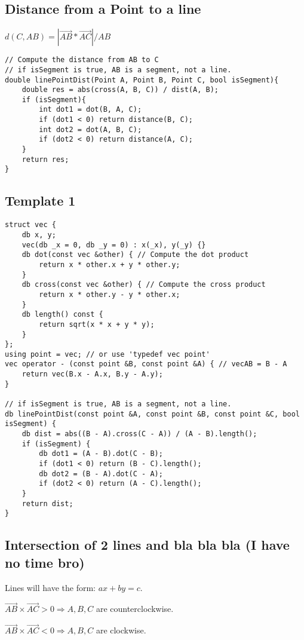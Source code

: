 \documentclass[11pt,a4paper]{article}
\begin{document}
\begin{multicols*}{2}
\subsection{Distance from a Point to a line}
$d(C, AB) = |\vec{AB} * \vec{AC}|/AB $
\begin{lstlisting}
// Compute the distance from AB to C
// if isSegment is true, AB is a segment, not a line.
double linePointDist(Point A, Point B, Point C, bool isSegment){
    double res = abs(cross(A, B, C)) / dist(A, B);
    if (isSegment){
        int dot1 = dot(B, A, C);
        if (dot1 < 0) return distance(B, C);
        int dot2 = dot(A, B, C);
        if (dot2 < 0) return distance(A, C);
    }
    return res;
}
\end{lstlisting}

\subsection{Template 1}
\begin{lstlisting}
struct vec {
    db x, y;
    vec(db _x = 0, db _y = 0) : x(_x), y(_y) {}
    db dot(const vec &other) { // Compute the dot product
        return x * other.x + y * other.y;
    }
    db cross(const vec &other) { // Compute the cross product
        return x * other.y - y * other.x;
    }
    db length() const {
        return sqrt(x * x + y * y);
    }
};
using point = vec; // or use 'typedef vec point'
vec operator - (const point &B, const point &A) { // vecAB = B - A
    return vec(B.x - A.x, B.y - A.y);
}

// if isSegment is true, AB is a segment, not a line.
db linePointDist(const point &A, const point &B, const point &C, bool isSegment) {
    db dist = abs((B - A).cross(C - A)) / (A - B).length();
    if (isSegment) {
        db dot1 = (A - B).dot(C - B);
        if (dot1 < 0) return (B - C).length();
        db dot2 = (B - A).dot(C - A);
        if (dot2 < 0) return (A - C).length();
    }
    return dist;
}
\end{lstlisting}

\subsection{Intersection of 2 lines and bla bla bla (I have no time bro)}
Lines will have the form: $ax + by = c$.

$\vec{AB} \times \vec{AC} > 0 \Rightarrow  A, B, C$ are counterclockwise.

$\vec{AB} \times \vec{AC} < 0 \Rightarrow  A, B, C$ are clockwise.


\end{multicols*}
\end{document}
